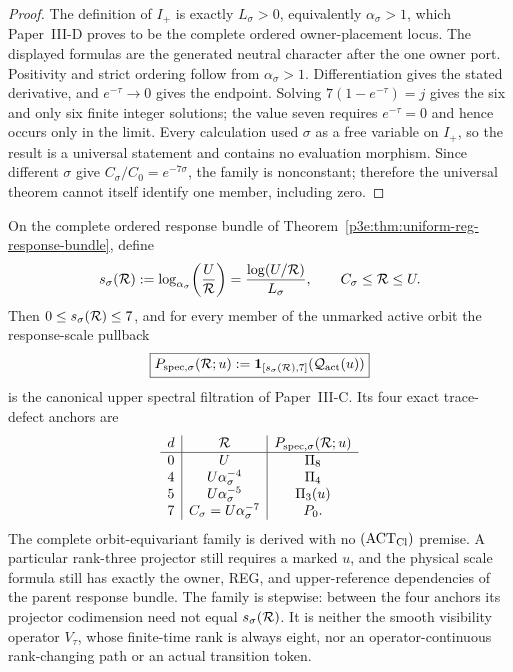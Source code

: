 \documentclass[12pt,a4paper]{article}
\begin{document}
\begin{proof}
The definition of \(I_+\) is exactly \(L_\sigma>0\), equivalently
\(\alpha_\sigma>1\), which Paper~III-D proves to be the complete ordered
owner-placement locus.  The displayed formulas are the generated neutral
character after the one owner port.  Positivity and strict ordering follow
from \(\alpha_\sigma>1\).  Differentiation gives the stated derivative, and
\(e^{-\tau}\to0\) gives the endpoint.  Solving
\(7(1-e^{-\tau})=j\) gives the six and only six finite integer solutions;
the value seven requires \(e^{-\tau}=0\) and hence occurs only in the limit.
Every calculation used \(\sigma\) as a free variable on \(I_+\), so the
result is a universal statement and contains no evaluation morphism.  Since
different \(\sigma\) give
\(C_\sigma/C_0=e^{-7\sigma}\), the family is nonconstant; therefore the
universal theorem cannot itself identify one member, including zero.
\end{proof}

\begin{corollary}
\label{p3e:cor:owner-typed-active-spectral-profile}
On the complete ordered response bundle of
Theorem~\ref{p3e:thm:uniform-reg-response-bundle}, define
\[
 s_\sigma(\mathcal R)
 :=\log_{\alpha_\sigma}\!\left(\frac U{\mathcal R}\right)
 =\frac{\log(U/\mathcal R)}{L_\sigma},
 \qquad C_\sigma\le\mathcal R\le U.
\]
Then \(0\le s_\sigma(\mathcal R)\le7\), and for every member of the unmarked
active orbit the response-scale pullback
\begin{equation}
\label{p3e:eq:owner-typed-active-spectral-profile}
 \boxed{
 P_{{\rm spec},\sigma}(\mathcal R;u)
 :=\mathbf1_{[s_\sigma(\mathcal R),7]}
       (\mathcal Q_{\rm act}(u))}
\end{equation}
is the canonical upper spectral filtration of Paper~III-C.  Its four exact
trace-defect anchors are
\begin{equation}
\label{p3e:eq:response-scale-active-spectral-anchors}
\begin{array}{c|c|c}
 d & \mathcal R & P_{{\rm spec},\sigma}(\mathcal R;u)\\ \hline
 0&U&\Pi_8\\
 4&U\alpha_\sigma^{-4}&\Pi_4\\
 5&U\alpha_\sigma^{-5}&\Pi_3(u)\\
 7&C_\sigma=U\alpha_\sigma^{-7}&P_0.
\end{array}
\end{equation}
The complete orbit-equivariant family is derived with no
\((\mathrm{ACT}_{\rm Cl})\) premise.  A particular rank-three projector still
requires a marked \(u\), and the physical scale formula still has exactly the
owner, REG, and upper-reference dependencies of the parent response bundle.
The family is stepwise: between the four anchors its projector codimension
need not equal \(s_\sigma(\mathcal R)\).  It is neither the smooth visibility
operator \(V_\tau\), whose finite-time rank is always eight, nor an
operator-continuous rank-changing path or an actual transition token.
\end{corollary}
\end{document}
